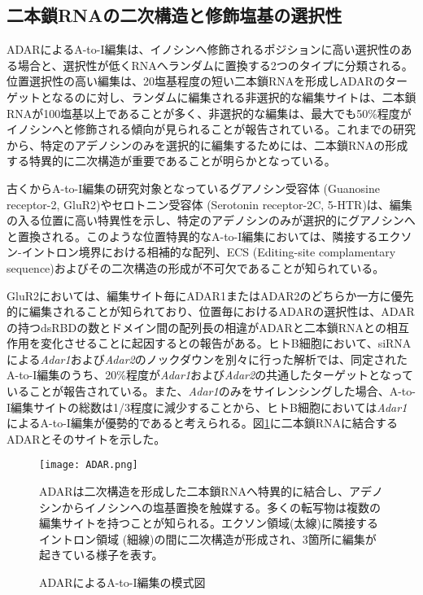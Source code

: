 \subsection{二本鎖RNAの二次構造と修飾塩基の選択性}
ADARによるA-to-I編集は、イノシンへ修飾されるポジションに高い選択性のある場合と、選択性が低くRNAへランダムに置換する2つのタイプに分類される。位置選択性の高い編集は、20塩基程度の短い二本鎖RNAを形成しADARのターゲットとなるのに対し、ランダムに編集される非選択的な編集サイトは、二本鎖RNAが100塩基以上であることが多く、非選択的な編集は、最大でも50\%程度がイノシンへと修飾される傾向が見られることが報告されている。これまでの研究から、特定のアデノシンのみを選択的に編集するためには、二本鎖RNAの形成する特異的に二次構造が重要であることが明らかとなっている。
\par
古くからA-to-I編集の研究対象となっているグアノシン受容体 (Guanosine receptor-2, GluR2)やセロトニン受容体 (Serotonin receptor-2C, 5-HTR)は、編集の入る位置に高い特異性を示し、特定のアデノシンのみが選択的にグアノシンへと置換される。このような位置特異的なA-to-I編集においては、隣接するエクソン-イントロン境界における相補的な配列、ECS (Editing-site complamentary sequence)およびその二次構造の形成が不可欠であることが知られている。
\par
GluR2においては、編集サイト毎にADAR1またはADAR2のどちらか一方に優先的に編集されることが知られており、位置毎におけるADARの選択性は、ADARの持つdsRBDの数とドメイン間の配列長の相違がADARと二本鎖RNAとの相互作用を変化させることに起因するとの報告がある。ヒトB細胞において、siRNAによる\textit{Adar1}および\textit{Adar2}のノックダウンを別々に行った解析では、同定されたA-to-I編集のうち、20\%程度が\textit{Adar1}および\textit{Adar2}の共通したターゲットとなっていることが報告されている。また、\textit{Adar1}のみをサイレンシングした場合、A-to-I編集サイトの総数は1/3程度に減少することから、ヒトB細胞においては\textit{Adar1}によるA-to-I編集が優勢的であると考えられる。図\ref{fig:ADAR}に二本鎖RNAに結合するADARとそのサイトを示した。
\begin{figure}[!h]
	\begin{center}
		\texttt{[image: ADAR.png]}
	\end{center}
	\caption{ADARによるA-to-I編集の模式図}
	\begin{flushleft}
		\small{ADARは二次構造を形成した二本鎖RNAへ特異的に結合し、アデノシンからイノシンへの塩基置換を触媒する。多くの転写物は複数の編集サイトを持つことが知られる。エクソン領域(太線)に隣接するイントロン領域 (細線)の間に二次構造が形成され、3箇所に編集が起きている様子を表す。}
	\end{flushleft}
	\label{fig:ADAR}
\end{figure}

